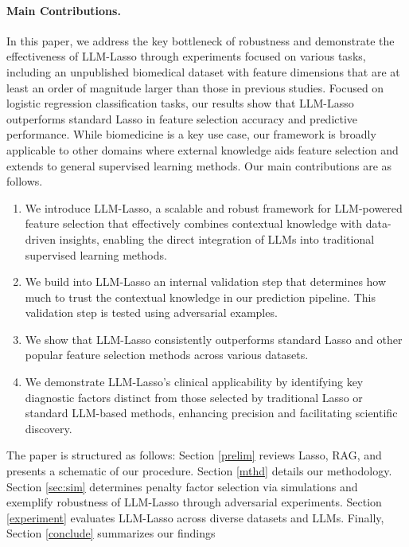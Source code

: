 \paragraph{Main Contributions.} In this paper, we address the key bottleneck of robustness and demonstrate the effectiveness of LLM-Lasso through experiments focused on various tasks, including an unpublished biomedical dataset with feature dimensions that are at least an order of magnitude larger than those in previous studies.  Focused on logistic regression classification tasks, our results show that LLM-Lasso outperforms standard Lasso in feature selection accuracy and predictive performance. While biomedicine is a key use case, our framework is broadly applicable to other domains where external knowledge aids feature selection and extends to general supervised learning methods.
Our main contributions are as follows.
\begin{enumerate}
\item We introduce LLM-Lasso, a scalable and robust framework for LLM-powered feature selection that effectively combines contextual knowledge with data-driven insights, enabling the direct integration of LLMs into traditional supervised learning methods.
\item We build into  LLM-Lasso  an internal validation step that determines how much to trust the contextual knowledge in our prediction pipeline. This validation step is tested using adversarial examples.
\item We show that LLM-Lasso consistently outperforms standard Lasso and other popular feature selection methods across various datasets.
\item We demonstrate LLM-Lasso's clinical applicability by identifying key diagnostic factors distinct from those selected by traditional Lasso or standard LLM-based methods, enhancing precision and facilitating scientific discovery.
\end{enumerate}

The paper is structured as follows: Section \ref{prelim} reviews Lasso, RAG, and presents a schematic of our procedure. Section \ref{mthd} details our methodology. Section \ref{sec:sim} determines penalty factor selection via simulations and exemplify robustness of LLM-Lasso through adversarial experiments. Section \ref{experiment} evaluates LLM-Lasso across diverse datasets and LLMs. Finally, Section \ref{conclude} summarizes our findings

